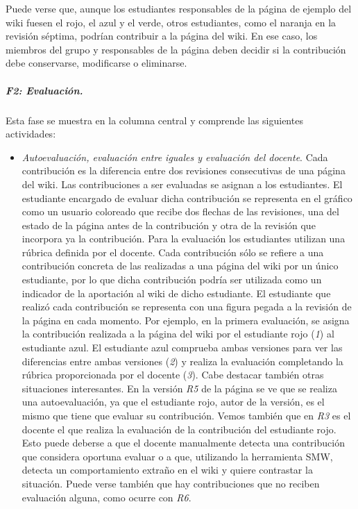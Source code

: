			Puede verse que, aunque los estudiantes responsables de la página de ejemplo del wiki fuesen el rojo, el azul y el verde, otros estudiantes, como el naranja en la revisión séptima, podrían contribuir a la página del wiki. En ese caso, los miembros del grupo y responsables de la página deben decidir si la contribución debe conservarse, modificarse o eliminarse.

			\subparagraph*{F2: Evaluación.}

			Esta fase se muestra en la columna central y comprende las siguientes actividades:

			\begin{itemize}
				\item \emph{Autoevaluación, evaluación entre iguales y evaluación del docente}. Cada contribución es la diferencia entre dos revisiones consecutivas de una página del wiki. Las contribuciones a ser evaluadas se asignan a los estudiantes. El estudiante encargado de evaluar dicha contribución se representa en el gráfico como un usuario coloreado que recibe dos flechas de las revisiones, una del estado de la página antes de la contribución y otra de la revisión que incorpora ya la contribución. Para la evaluación los estudiantes utilizan una rúbrica definida por el docente. Cada contribución sólo se refiere a una contribución concreta de las realizadas a una página del wiki por un único estudiante, por lo que dicha contribución podría ser utilizada como un indicador de la aportación al wiki de dicho estudiante. El estudiante que realizó cada contribución se representa con una figura pegada a la revisión de la página en cada momento.
Por ejemplo, en la primera evaluación, se asigna la contribución realizada a la página del wiki por el estudiante rojo (\emph{1}) al estudiante azul. El estudiante azul comprueba ambas versiones para ver las diferencias entre ambas versiones (\emph{2}) y realiza la evaluación completando la rúbrica proporcionada por el docente (\emph{3}).
Cabe destacar también otras situaciones interesantes. En la versión \emph{R5} de la página se ve que se realiza una autoevaluación, ya que el estudiante rojo, autor de la versión, es el mismo que tiene que evaluar su contribución. Vemos también que en \emph{R3} es el docente el que realiza la evaluación de la contribución del estudiante rojo. Esto puede deberse a que el docente manualmente detecta una contribución que considera oportuna evaluar o a que, utilizando la herramienta SMW, detecta un comportamiento extraño en el wiki y quiere contrastar la situación. 
Puede verse también que hay contribuciones que no reciben evaluación alguna, como ocurre con \emph{R6}. 

\end{itemize}
